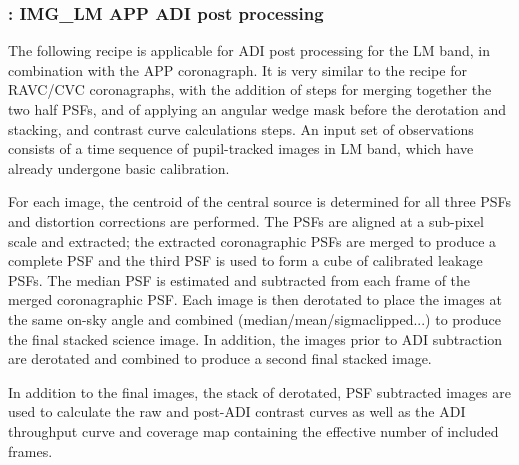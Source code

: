 \subsubsection{: IMG\_LM APP ADI post processing}
\label{sssec:adi_img_app}


The following recipe is applicable for ADI post processing for the LM
band, in combination with the APP coronagraph. It is very
similar to the recipe for RAVC/CVC coronagraphs, with the
addition of steps for merging together the two half PSFs, and of
applying an angular wedge mask before the derotation and stacking, and
contrast curve calculations steps. An input set of observations
consists of a time sequence of pupil-tracked images in LM band, which have
already undergone basic calibration.

For each image, the centroid of the central source is determined for
all three PSFs and distortion corrections are performed. The PSFs are
aligned at a sub-pixel scale and extracted; the extracted
coronagraphic PSFs are merged to produce a complete PSF and the third
PSF is used to form a cube of calibrated leakage PSFs.  The
median PSF is estimated and subtracted from each
frame of the merged coronagraphic PSF. Each image is then derotated to
place the images at the same on-sky angle and combined (median/mean/sigmaclipped...) to
produce the final stacked science image. In addition, the images prior
to ADI subtraction are derotated and combined to produce a second
final stacked image.

In addition to the final images, the stack of derotated, PSF
subtracted images are used to calculate the raw and post-ADI contrast
curves as well as the ADI throughput curve and coverage map containing
the effective number of included frames.





